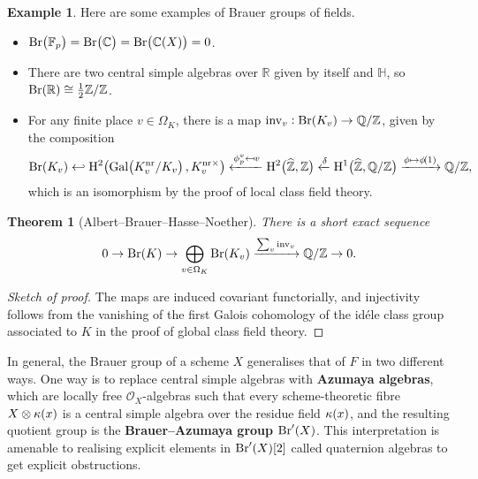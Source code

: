 \documentclass{article}
\theoremstyle{plain}
\newtheorem*{theorem}{Theorem}
\theoremstyle{definition}
\newtheorem*{example}{Example}
\newcommand{\Br}{\mathrm{Br}}
\newcommand{\CC}{\mathbb{C}}
\newcommand{\FF}{\mathbb{F}}
\newcommand{\Gal}{\mathrm{Gal}}
\renewcommand{\H}{\mathrm{H}}
\newcommand{\HH}{\mathbb{H}}
\newcommand{\inv}{\mathrm{inv}}
\newcommand{\nr}{\mathrm{nr}}
\newcommand{\OOO}{\mathcal{O}}
\newcommand{\QQ}{\mathbb{Q}}
\newcommand{\RR}{\mathbb{R}}
\newcommand{\ZZ}{\mathbb{Z}}
\newcommand{\br}{\!\del}
\begin{document}
\begin{example}
Here are some examples of Brauer groups of fields.
\begin{itemize}
\item $ \Br\br{\FF_p} = \Br\br[1]{\CC} = \Br\br[1]{\CC\br{X}} = 0 $.
\item There are two central simple algebras over $ \RR $ given by itself and $ \HH $, so $ \Br\br{\RR} \cong \tfrac{1}{2}\ZZ / \ZZ $.
\item For any finite place $ v \in \Omega_K $, there is a map $ \inv_v : \Br\br{K_v} \to \QQ / \ZZ $, given by the composition
$$ \Br\br{K_v} \hookleftarrow \H^2\br[1]{\Gal\br{K_v^{\nr} / K_v}, K_v^{\nr\times}} \xleftarrow{\phi_p^v \mapsfrom v} \H^2\br[1]{\widehat{\ZZ}, \ZZ} \xleftarrow{\delta} \H^1\br[1]{\widehat{\ZZ}, \QQ / \ZZ} \xrightarrow{\phi \mapsto \phi\br{1}} \QQ / \ZZ, $$
which is an isomorphism by the proof of local class field theory.
\end{itemize}
\end{example}

\begin{theorem}[Albert--Brauer--Hasse--Noether]
There is a short exact sequence
$$ 0 \to \Br\br{K} \to \bigoplus_{v \in \Omega_K} \Br\br{K_v} \xrightarrow{\sum_v \inv_v} \QQ / \ZZ \to 0. $$
\end{theorem}

\begin{proof}[Sketch of proof]
The maps are induced covariant functorially, and injectivity follows from the vanishing of the first Galois cohomology of the id\'ele class group associated to $ K $ in the proof of global class field theory.
\end{proof}

In general, the Brauer group of a scheme $ X $ generalises that of $ F $ in two different ways. One way is to replace central simple algebras with \textbf{Azumaya algebras}, which are locally free $ \OOO_X $-algebras such that every scheme-theoretic fibre $ X \otimes \kappa\br{x} $ is a central simple algebra over the residue field $ \kappa\br{x} $, and the resulting quotient group is the \textbf{Brauer--Azumaya group} $ \Br'\br{X} $. This interpretation is amenable to realising explicit elements in $ \Br'\br{X}\sbr{2} $ called quaternion algebras to get explicit obstructions.
\end{document}
